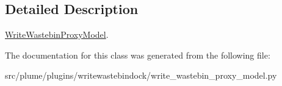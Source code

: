 \subsection{Detailed Description}
\hyperlink{classplume-creator_1_1src_1_1plume_1_1plugins_1_1writewastebindock_1_1write__wastebin__proxy__moe56e22e3e5d294c2c5a878e7ed44fa84}{Write\+Wastebin\+Proxy\+Model}. 

The documentation for this class was generated from the following file\+:\begin{DoxyCompactItemize}
\item 
src/plume/plugins/writewastebindock/write\+\_\+wastebin\+\_\+proxy\+\_\+model.\+py\end{DoxyCompactItemize}
